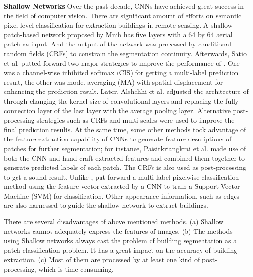 \textbf{Shallow Networks} Over the past decade, CNNs have achieved great success in the field of computer vision.
There are significant amount of efforts on semantic pixel-level classification for extraction buildings in remote sensing.
A shallow patch-based network proposed by Mnih \cite{IEEEexample:mnih2013machine} has five layers with a 64 by 64 aerial patch as input.
And the output of the network was processed by conditional random fields (CRFs) to constrain the segmentation continuity.
Afterwards, Satio et al. \cite{IEEEexample:saito2016multiple} putted forward two major strategies to improve the performance of \cite{IEEEexample:mnih2013machine}.
One was a channel-wise inhibited softmax (CIS) for getting a multi-label prediction result, the other was model averaging (MA) with spatial displacement for enhancing the prediction result. 
Later, Alshehhi et al. \cite{IEEEexample:alshehhi2017simultaneous} adjusted the architecture of \cite{IEEEexample:mnih2013machine} through changing the kernel size of convolutional layers and replacing the fully connection layer of the last layer with the average pooling layer. 
Alternative post-processing strategies such as CRFs and multi-scales were used to improve the final prediction results. 
At the same time, some other methods took advantage of the feature extraction capability of CNNs to generate feature descriptions of patches for further segmentation; for instance, 
Paisitkriangkrai et al. \cite{IEEEexample:paisitkriangkrai2015effective} made use of both the CNN and hand-craft extracted features and combined them together to generate predicted labels of each patch. 
The CRFs is also used as post-processing to get a sound result. 
Unlike \cite{IEEEexample:paisitkriangkrai2015effective}, \cite{IEEEexample:he2017multi} put forward a multi-label pixelwise classification method using the feature vector extracted by a CNN to train a Support Vector Machine (SVM) for classification. 
Other appearance information, such as edges \cite{IEEEexample:zhao2017contextually} are also harnessed to guide the shallow network to extract buildings.


There are several disadvantages of above mentioned methods. (a) Shallow networks cannot adequately express the features of images. 
(b) The methods using Shallow networks always cast the problem of building segmentation as a patch classification problem. It has a great impact on the accuracy of building extraction. 
(c) Most of them are processed by at least one kind of post-processing, which is time-consuming.

